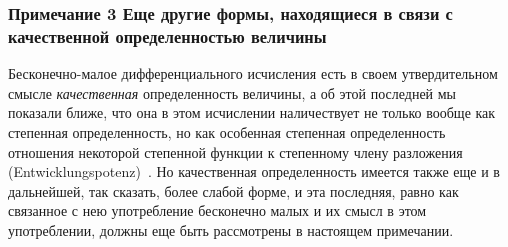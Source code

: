 \bigskip


\subsubsection[Примечание 3 Еще другие формы, находящиеся в связи с качественной определенностью величины]
{Примечание 3 Еще другие формы, находящиеся в связи с качественной определенностью величины}
\label{bkm:bm53a}

Бесконечно-малое дифференциального исчисления есть в своем утвердительном
смысле {\em качественная} определенность величины, а об
этой последней мы показали ближе, что она в этом исчислении наличествует не
только вообще как степенная определенность, но как особенная степенная
определенность отношения некоторой степенной функции к степенному члену
разложения (Entwicklungspotenz)~. Но качественная определенность
имеется также еще и в дальнейшей, так сказать, более слабой форме, и эта
последняя, равно как связанное с нею употребление бесконечно малых и их
смысл в этом употреблении, должны еще быть рассмотрены в настоящем
примечании.

